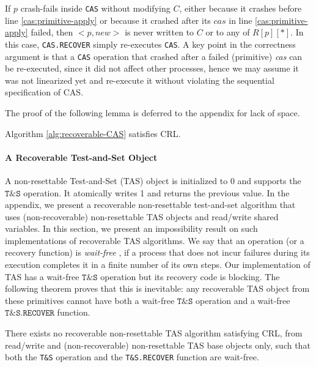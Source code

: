 If $p$ crash-fails inside \texttt{CAS} without modifying $C$, either because it crashes before line \ref{cas:primitive-apply} or because it crashed after its $cas$ in line \ref{cas:primitive-apply} failed, then ${<}p,new{>}$ is never written to $C$ or to any of $R[p][*]$. In this case, \texttt{CAS.RECOVER} simply re-executes  \texttt{CAS}. A key point in the correctness argument is that a \texttt{CAS} operation that crashed after a failed (primitive) \emph{cas} can be re-executed, since it did not affect other processes, hence we may assume it was not linearized yet and re-execute it without violating the sequential specification of CAS.

The proof of the following lemma is deferred to the appendix for lack of space.

\begin{lemma}
\label{lemma:CAS-alg-is-CRL}
	Algorithm \ref{alg:recoverable-CAS} satisfies CRL.
\end{lemma}


\paragraph*{A Recoverable Test-and-Set Object}

A non-resettable Test-and-Set (TAS) object is initialized to 0 and supports the $\texttt{T\&S}$ operation. It atomically writes 1 and returns the previous value. In the appendix, we present a recoverable non-resettable test-and-set algorithm that uses (non-recoverable) non-resettable TAS objects and read/write shared variables. In this section, we present an impossibility result on such implementations of recoverable TAS algorithms. We say that an operation (or a recovery function) is \emph{wait-free} \cite{herlihy91waitfree}, if a process that does not incur failures during its execution completes it in a finite number of its own steps. Our implementation of TAS has a wait-free $\texttt{T\&S}$ operation but its recovery code is blocking. The following theorem proves that this is inevitable: any recoverable TAS object from these primitives cannot have both a wait-free $\texttt{T\&S}$ operation and a wait-free $\texttt{T\&S.RECOVER}$ function.

\begin{theorem}
	There exists no recoverable non-resettable TAS algorithm satisfying CRL, from read/write and (non-recoverable) non-resettable TAS base objects only, such that both the \texttt{T\&S} operation and the \texttt{T\&S.RECOVER} function are wait-free.
\end{theorem}

